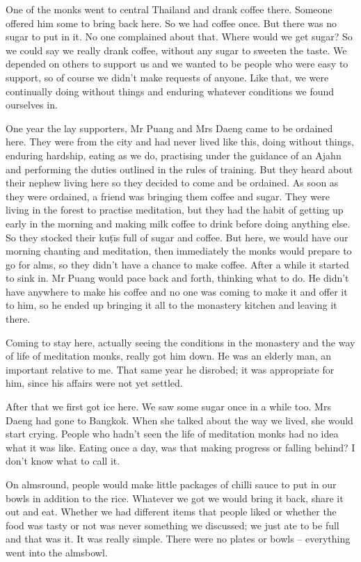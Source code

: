 One of the monks went to central Thailand and drank coffee there. Some\-one offered him some to bring back here. So we had coffee once. But there was no sugar to put in it. No one complained about that. Where would we get sugar? So we could say we really drank coffee, without any sugar to sweeten the taste. We depended on others to support us and we wanted to be people who were easy to support, so of course we didn't make requests of anyone. Like that, we were continually doing without things and enduring whatever conditions we found ourselves in. 

One year the lay supporters, Mr Puang and Mrs Daeng came to be ordained here. They were from the city and had never lived like this, doing without things, enduring hardship, eating as we do, practising under the guidance of an Ajahn and performing the duties outlined in the rules of training. But they heard about their nephew living here so they decided to come and be ordained. As soon as they were ordained, a friend was bringing them coffee and sugar. They were living in the forest to practise meditation, but they had the habit of getting up early in the morning and making milk coffee to drink before doing anything else. So they stocked their ku\d{t}\={\i}s full of sugar and coffee. But here, we would have our morning chanting and meditation, then immediately the monks would prepare to go for alms, so they didn't have a chance to make coffee. After a while it started to sink in. Mr Puang would pace back and forth, thinking what to do. He didn't have anywhere to make his coffee and no one was coming to make it and offer it to him, so he ended up bringing it all to the monastery kitchen and leaving it there. 

Coming to stay here, actually seeing the conditions in the monastery and the way of life of meditation monks, really got him down. He was an elderly man, an important relative to me. That same year he disrobed; it was appropriate for him, since his affairs were not yet settled. 

After that we first got ice here. We saw some sugar once in a while too. Mrs Daeng had gone to Bangkok. When she talked about the way we lived, she would start crying. People who hadn't seen the life of meditation monks had no idea what it was like. Eating once a day, was that making progress or falling behind? I don't know what to call it. 

On almsround, people would make little packages of chilli sauce to put in our bowls in addition to the rice. Whatever we got we would bring it back, share it out and eat. Whether we had different items that people liked or whether the food was tasty or not was never something we discussed; we just ate to be full and that was it. It was really simple. There were no plates or bowls -- everything went into the almsbowl. 


